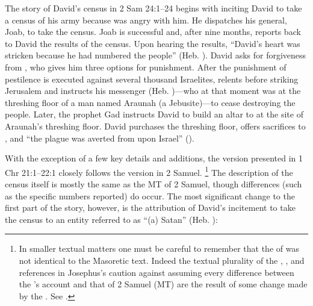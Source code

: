 The story of David's census in 2 Sam 24:1--24 begins with \yahweh inciting David to take a census of his army because \yahweh was angry with him. He dispatches his general, Joab, to take the census. Joab is successful and, after nine months, reports back to David the results of the census. Upon hearing the results, ``David's heart was stricken because he had numbered the people'' (Heb. ). David asks for forgiveness from \yahweh, who gives him three options for punishment. After the punishment of pestilence is executed against several thousand Israelites, \yahweh relents before striking Jerusalem and instructs his messenger (Heb. )---who at that moment was at the threshing floor of a man named Araunah (a Jebusite)---to cease destroying the people. Later, the prophet Gad instructs David to build an altar to \yahweh at the site of Araunah's threshing floor. David purchases the threshing floor, offers sacrifices to \yahweh, and ``the plague was averted from upon Israel'' ().

With the exception of a few key details and additions, the version presented in 1 Chr 21:1--22:1 closely follows the version in 2 Samuel.%
    \footnote{In smaller textual matters one must be careful to remember that the \vorlage of \chronicles was not identical to the Masoretic text. Indeed the textual plurality of the \lxx, , and references in Josephus's \antiquities caution against assuming every difference between the \chronicler's account and that of 2 Samuel (MT) are the result of some change made by the \chronicler. See \cite[761--762]{knoppers2007}.}
The description of the census itself is mostly the same as the MT of 2 Samuel, though differences (such as the specific numbers reported) do occur. The most significant change to the first part of the story, however, is the attribution of David's incitement to take the census to an entity referred to as ``(a) Satan'' (Heb. ):

